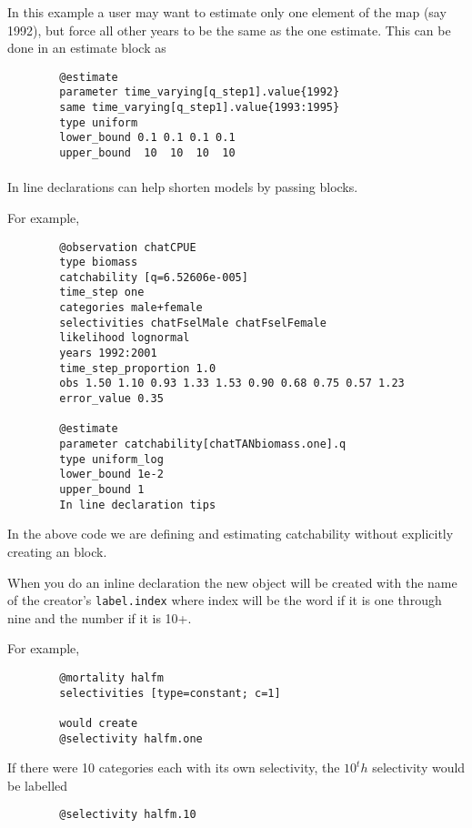 In this example a user may want to estimate only one element of the map (say 1992), but force all other years to be the same as the one estimate. This can be done in an estimate block as

{\small{\begin{verbatim}
		@estimate
		parameter time_varying[q_step1].value{1992}
		same time_varying[q_step1].value{1993:1995}
		type uniform
		lower_bound 0.1 0.1 0.1 0.1
		upper_bound  10  10  10  10
		\end{verbatim}}}
	
\paragraph*{\label{sec:declare}}

In line declarations can help shorten models by passing \command{} blocks.

For example,

{\small{\begin{verbatim}
		@observation chatCPUE
		type biomass
		catchability [q=6.52606e-005]
		time_step one
		categories male+female
		selectivities chatFselMale chatFselFemale
		likelihood lognormal
		years 1992:2001
		time_step_proportion 1.0
		obs 1.50 1.10 0.93 1.33 1.53 0.90 0.68 0.75 0.57 1.23
		error_value 0.35

		@estimate
		parameter catchability[chatTANbiomass.one].q
		type uniform_log
		lower_bound 1e-2
		upper_bound 1
		In line declaration tips
		\end{verbatim}}}

In the above code we are defining and estimating catchability without explicitly creating an  block.

When you do an inline declaration the new object will be created with the name of the creator's \texttt{label.index} where index will be the word if it is one through nine and the number if it is 10+.

For example,

{\small{\begin{verbatim}
		@mortality halfm
		selectivities [type=constant; c=1]

		would create
		@selectivity halfm.one
		\end{verbatim}}}

If there were 10 categories each with its own selectivity, the $10^th$ selectivity would be labelled

{\small{\begin{verbatim}
		@selectivity halfm.10
		\end{verbatim}}}

